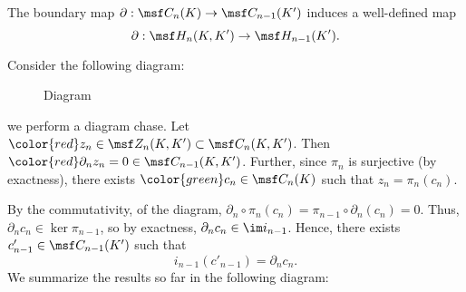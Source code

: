 \begin{problem}[18.25]
  The boundary map $\partial : \msf C_n(K) \to \msf C_{n-1}(K')$
  induces a well-defined map
  \[
    \partial : \msf H_n(K,K') \to \msf H_{n-1}(K').
  \]
\end{problem}
\begin{solution}
  Consider the following diagram:
  \begin{figure}[H]
    \centering
    \caption{Diagram}
  \end{figure}
  we perform a diagram chase. Let ${\color{red} z_n} \in \msf
  Z_n(K,K') \subset \msf C_n(K,K')$. Then ${\color{red}\partial_n z_n}
  = 0\in \msf C_{n-1}(K,K')$. Further, since $\pi_n$ is surjective (by
  exactness), there exists $\color{green} c_n \in \msf C_n(K)$ such
  that $z_n = \pi_n(c_n)$.

  By the commutativity, of the diagram, $\partial_n \circ \pi_n (c_n)
  = \pi_{n-1} \circ \partial_n(c_n) = 0$. Thus, $\partial_n c_n \in
  \ker \pi_{n-1}$, so by exactness, $\partial_n c_n \in \im i_{n-1}$.
  Hence, there exists $c'_{n-1} \in \msf C_{n-1}(K')$ such that
  \[
    i_{n-1}(c'_{n-1}) = \partial_n c_n.
  \]
  We summarize the results so far in the following diagram:
  \begin{figure}[H]
    \centering
    \begin{tikzpicture}[scale=1.2]


\end{tikzpicture}
\end{figure}
\end{solution}
